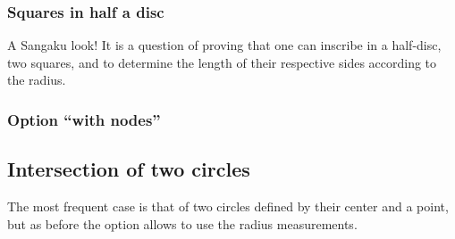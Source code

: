 \subsubsection{Squares in half a disc}

A Sangaku look! It is a question of proving that one can inscribe in a
half-disc, two squares, and to determine the length of their respective sides
according to the radius.

\begin{tkzexample}[latex=7cm,small]
\end{tkzexample}

\newpage

\subsubsection{Option \enquote{with nodes}}

\begin{tkzexample}[latex=7cm,small]
\end{tkzexample}

\subsection{Intersection of two circles}

The most frequent case is that of two circles defined by their center and a
point, but as before the option  allows to use the radius
measurements.

